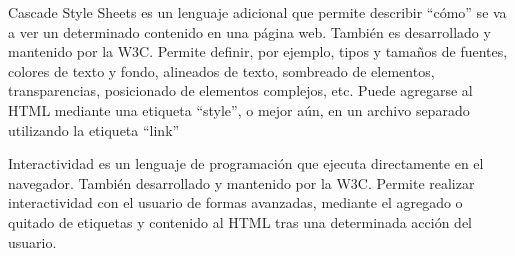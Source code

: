 
\begin{frame}[fragile]{Cascade Style Sheets}
	 es un lenguaje adicional que permite describir “cómo” se va a
	ver un determinado contenido en una página web.
	\jump
	También es desarrollado y mantenido por la W3C.
	\jump
	Permite definir, por ejemplo, tipos y tamaños de fuentes, colores de texto y
	fondo, alineados de texto, sombreado de elementos, transparencias, posicionado
	de elementos complejos, etc.
	\jump
	Puede agregarse al HTML mediante una etiqueta “style”, o mejor aún, en un
	archivo separado utilizando la etiqueta “link”
	\jump
	\small
\end{frame}


\begin{frame}[fragile]{Interactividad}
	 es un lenguaje de programación que ejecuta directamente
	en el navegador.
	\jump
	También desarrollado y mantenido por la W3C.
	\jump
	Permite realizar interactividad con el usuario de formas avanzadas, mediante
	el agregado o quitado de etiquetas y contenido al HTML tras una determinada
	acción del usuario.
	\jump
	\small
\end{frame}